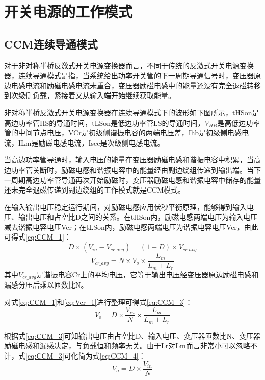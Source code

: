 								



\section{开关电源的工作模式}
\label{sec:dataset-build}
\subsection{CCM连续导通模式}
对于非对称半桥反激式开关电源变换器而言，不同于传统的反激式开关电源变换器，连续导通模式是指，当系统给出功率开关管的下一周期导通信号时，变压器原边电感电流和励磁电感电流未重合，变压器励磁电感中的能量还没有完全退磁转移到次级侧负载，紧接着又从输入端开始继续获取能量。

非对称半桥反激式开关电源变换器在连续导通模式下的波形如下图所示，tHSon是高边功率管HS的导通时间，tLSon是低边功率管LS的导通时间，$V_{HB}$是高低边功率管的中间节点电压，VCr是初级侧谐振电容的两端电压差，Ihb是初级侧电感电流，ILm是励磁电感电流，Isec是次级侧电感电流。

当高边功率管导通时，输入电压的能量在变压器励磁电感和谐振电容中积累，当高边功率管关断时，励磁电感和谐振电容中的能量经由副边绕组传递到输出端。当下一周期高边功率管导通再次开始励磁时，变压器励磁电感和谐振电容中储存的能量还未完全退磁传递到副边绕组的工作模式就是CCM模式。

在输入输出电压稳定运行期间，对励磁电感应用伏秒平衡原理，能够得到输入电压、输出电压和占空比D之间的关系。在tHSon内，励磁电感两端电压为输入电压减去谐振电容电压Vcr；在tLSon内，励磁电感两端电压为谐振电容电压Vcr，由此可得式\eqref{eq:CCM_1}：
\begin{equation}
    \label{eq:CCM_1}
    D\times(V_{in}−V_{cr\_avg})=(1−D)\times V_{cr\_avg}
\end{equation}
\begin{equation}
    \label{eq:Vcr_1}
    V_{cr\_avg}=N \times V_o\times\frac{L_m}{L_m+L_r}
\end{equation}
其中$V_{cr\_avg}$是谐振电容Cr上的平均电压，它等于输出电压经变压器原边励磁电感和漏感分压后乘以匝数比N。

对式\eqref{eq:CCM_1}和\eqref{eq:Vcr_1}进行整理可得式\eqref{eq:CCM_3}：
\begin{equation}
    \label{eq:CCM_3}
    V_o=D \times \frac{V_{in}}{N} \times\frac{L_m}{L_m+L_r}  
\end{equation}

根据式\eqref{eq:CCM_3}可知输出电压由占空比D、输入电压、变压器匝数比N、变压器励磁电感和漏感决定，与负载恒和频率无关。由于Lr对Lm而言非常小可以忽略不计，式\eqref{eq:CCM_3}可化简为式\eqref{eq:CCM_4}：
\begin{equation}
    \label{eq:CCM_4}
    V_o=D \times \frac{V_{in}}{N}  
\end{equation}

